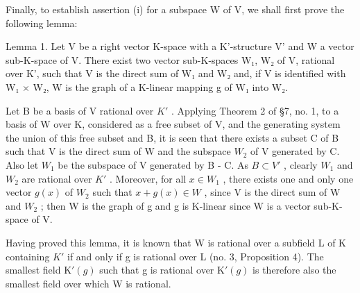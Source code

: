 Finally, to establish assertion (i) for a subspace W of V, we shall first prove the following lemma:

Lemma 1. Let V be a right vector K-space with a K'-structure V' and W a vector sub-K-space of V. There exist two vector sub-K-spaces W₁, W₂ of V, rational over K', such that V is the direct sum of W₁ and W₂ and, if V is identified with W₁ × W₂, W is the graph of a K-linear mapping g of W₁ into W₂.

Let B be a basis of V rational over \(K'\) . Applying Theorem 2 of §7, no. 1, to a basis of W over K, considered as a free subset of V, and the generating system the union of this free subset and B, it is seen that there exists a subset C of B such that V is the direct sum of W and the subspace \(W_{2}\) of V generated by C. Also let \(W_{1}\) be the subspace of V generated by B - C. As \(B \subset V'\) , clearly \(W_{1}\) and \(W_{2}\) are rational over \(K'\) . Moreover, for all \(x \in W_{1}\) , there exists one and only one vector \(g(x)\) of \(W_{2}\) such that \(x + g(x) \in W\) , since V is the direct sum of W and \(W_{2}\) ; then W is the graph of g and g is K-linear since W is a vector sub-K-space of V.

Having proved this lemma, it is known that W is rational over a subfield L of K containing \(K'\) if and only if g is rational over L (no. 3, Proposition 4). The smallest field \(\mathrm{K}'(g)\) such that g is rational over \(\mathrm{K}'(g)\) is therefore also the smallest field over which W is rational.
\relax{}

